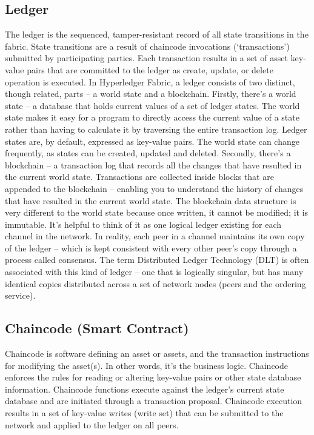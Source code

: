 \subsection{Ledger}
The ledger is the sequenced, tamper-resistant record of all state transitions in the fabric. State transitions are a result of chaincode invocations (‘transactions’) submitted by participating parties. 
Each transaction results in a set of asset key-value pairs that are committed to the ledger as create, update, or delete operation is executed. 
In Hyperledger Fabric, a ledger consists of two distinct, though related, parts – a world state and a blockchain. 
Firstly, there’s a world state – a database that holds current values of a set of ledger states. The world state makes it easy for a program to directly access the current value of a state rather than having to calculate it by traversing the entire transaction log. Ledger states are, by default, expressed as key-value pairs. The world state can change frequently, as states can be created, updated and deleted.
Secondly, there’s a blockchain – a transaction log that records all the changes that have resulted in the current world state. Transactions are collected inside blocks that are appended to the blockchain – enabling you to understand the history of changes that have resulted in the current world state. The blockchain data structure is very different to the world state because once written, it cannot be modified; it is immutable.\newline
It’s helpful to think of it as one logical ledger existing for each channel in the network. In reality, each peer in a channel maintains its own copy of the ledger – which is kept consistent with every other peer’s copy through a process called consensus. The term Distributed Ledger Technology (DLT) is often associated with this kind of ledger – one that is logically singular, but has many identical copies distributed across a set of network nodes (peers and the ordering service).
\subsection{Chaincode (Smart Contract)}
Chaincode is software defining an asset or assets, and the transaction instructions for modifying the asset(s). In other words, it’s the business logic. Chaincode enforces the rules for reading or altering key-value pairs or other state database information. Chaincode functions execute against the ledger’s current state database and are initiated through a transaction proposal. Chaincode execution results in a set of key-value writes (write set) that can be submitted to the network and applied to the ledger on all peers.
